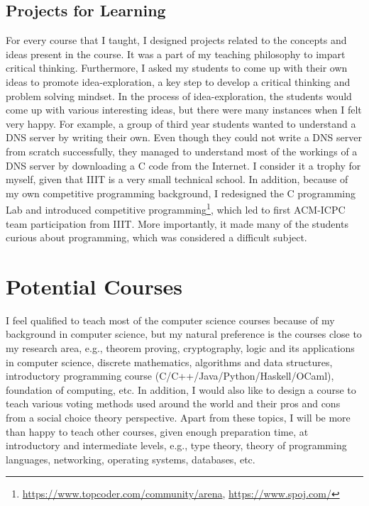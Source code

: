 \documentclass[a4paper]{article}
\begin{document}
\subsection{Projects for Learning}
For every course that I taught, I designed projects related to the concepts 
and ideas present in the course. It was a part of my teaching philosophy to impart 
critical thinking. Furthermore, I asked my students to come up with their own ideas to 
promote idea-exploration, a key step to develop a critical thinking and problem solving mindset. 
In the process of idea-exploration, the students would come up with various interesting 
ideas, but there were many instances when I felt very happy. For example, a group of third year students  
wanted to understand a DNS server by writing their own. Even though they 
could not write a DNS server from scratch successfully, they managed to understand 
most of the workings of a DNS server by downloading a C code from the Internet. 
I consider it a trophy for myself, given that IIIT is a very small technical school. 
In addition, because of my own 
competitive programming background, 
I redesigned the C programming Lab and introduced competitive 
programming\footnote{\url{https://www.topcoder.com/community/arena}, 
\url{https://www.spoj.com/}}, which led to first ACM-ICPC team participation 
from IIIT. More importantly, it made many of the students curious about 
programming, which was considered a difficult subject.

\section{Potential Courses}
I feel qualified to teach most of the computer science courses 
because of my background in computer science, but 
my natural preference is the courses close to my research 
area, e.g., theorem proving, cryptography, logic 
and its applications in computer science, discrete 
mathematics, algorithms and data structures, 
introductory programming course (C/C++/Java/Python/Haskell/OCaml),
foundation of computing, etc. 
In addition, I would also like to design a course to teach 
various voting methods used around the world and 
their pros and cons from a social choice theory perspective. 
Apart from these topics, I will 
be more than happy to teach other courses, given enough 
preparation time, at introductory and 
intermediate levels, e.g., type theory, theory of programming 
languages, networking, operating systems, databases, etc.
\end{document}
